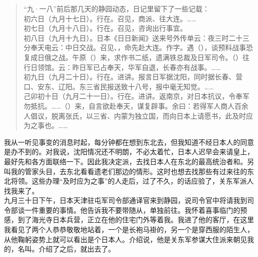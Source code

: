 \begin{quote}
	“九·一八”前后那几天的静园动态，日记里留下了一些记载：\\

初六日（九月十七日）。行在。召见，商派、往大连。……\\

初七日（九月十八日）。行在。召见，咨询出行事宜。\\

初八日（九月十九日）。日本《日日新闻》送来号外传单云：夜三时二十三分奉天电云：中日交战。召见、，命先赴大连。作字。遇（），谈预料战事恐复成日俄之战。午原（）来，求作书二纸，遗满铁总裁及日军司令。（）往行日领馆。云：昨日军已占奉天，华军自退，长春亦有战事。……\\

初九日（九月二十日）。行在。进讲。报言日军据沈阳，同时据长春、营口、安东、辽阳。东三省民报送致十八号，报中毫无知觉。……\\

己卯初十日（九月二十一日）。行在。进讲。返南京，对日本抗议，令奉军勿抵抗。……（）来，自言欲赴奉天，谋复辟事。余曰：若得军人商人百余人倡议，脱离张氏，以三省、内蒙为独立国，而向日本上请愿书，此及时应为之事也。……\\
\end{quote}

我从一听见事变的消息时起，每分钟都在想到东北去，但我知道不经日本人的同意是办不到的。对我说，沈阳情况还不明朗，不必太着忙，日本人迟早会来请皇上，最好先和各方面联络一下。因此我决定派，去找日本人在东北的最高统治者和。另叫我的管家头目，去东北看看遗老们那边的情形。这时也想去找那些有过来往的东北将领。这些办理“及时应为之事”的人走后，过了不久，的话应验了，关东军派人找我来了。\\

九月三十日下午，日本天津驻屯军司令部通译官来到静园，说司令官中将请我到司令部谈一件重要的事情。他告诉我不要带随从，单独前往。我怀着喜事临门的预感，到了海光寺日本兵营，正立在他的住宅门外等着我。我进了他的客厅，在这里我看见了两个人恭恭敬敬地站着，一个是长袍马褂的，另一个是穿西服的陌生人，从他鞠躬姿势上就可以看出是个日本人。介绍说，他是关东军参谋大住派来朝见我的，名叫。介绍了之后，就出去了。\\

